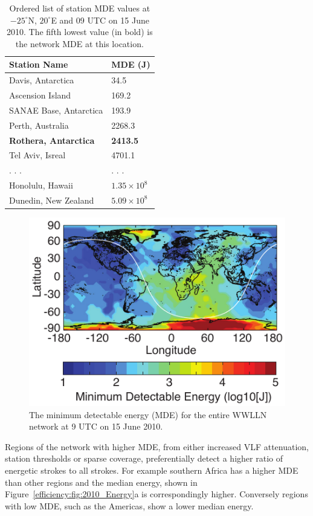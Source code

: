 \begin{table}[ht!]
\caption{Ordered list of station MDE values at $-25^\circ$N, $20^\circ$E and 09 UTC on 15 June 2010.
The fifth lowest value (in bold) is the network MDE at this location.}
\begin{center}
\begin{tabular}{p{2in}p{1in}}
\hline
Station Name 		& 	MDE (J)\\
\hline
\rule{0pt}{3ex}
Davis, Antarctica	&	34.5\\
Ascension Island	&	169.2\\
SANAE Base, Antarctica	&	193.9\\
Perth, Australia	&	2268.3\\
{\bf Rothera, Antarctica}	&	{\bf 2413.5}\\
Tel Aviv, Isreal	&	4701.1\\
. . .	&	. . .\\
Honolulu, Hawaii	&	$1.35 \times 10^8$\\
Dunedin, New Zealand	&	$5.09 \times 10^8$\\
\hline
\end{tabular}
\end{center}
\label{efficiency:table:mdeTable}
\end{table}

\begin{figure}[ht!]
   \centering
\noindent\includegraphics[scale=1]{efficiency/Figures/2012RS005049-p4.pdf}
   \caption{The minimum detectable energy (MDE) for the entire WWLLN network at 9 UTC on 15 June 2010.}
   \label{efficiency:fig:Minimum_Energy}
\end{figure}

Regions of the network with higher MDE, from either increased VLF attenuation, station thresholds or sparse coverage, preferentially detect a higher ratio of energetic strokes to all strokes.
For example southern Africa has a higher MDE than other regions and the median energy, shown in Figure~\ref{efficiency:fig:2010_Energy}a is correspondingly higher.
Conversely regions with low MDE, such as the Americas, show a lower median energy.

